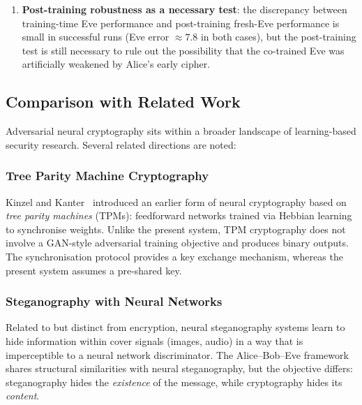 \documentclass[12pt, a4paper]{article}
\begin{document}
\begin{enumerate}[leftmargin=2em, itemsep=6pt]
  \item \textbf{Post-training robustness as a necessary test}: the
        discrepancy between training-time Eve performance and
        post-training fresh-Eve performance is small in successful runs
        (Eve error $\approx 7.8$ in both cases), but the post-training
        test is still necessary to rule out the possibility that the
        co-trained Eve was artificially weakened by Alice's early cipher.

\end{enumerate}

\subsection{Comparison with Related Work}
\label{subsec:related_work}

Adversarial neural cryptography sits within a broader landscape of
learning-based security research. Several related directions are noted:

\subsubsection*{Tree Parity Machine Cryptography}

Kinzel and Kanter~\cite{kinzel2002neural} introduced an earlier form
of neural cryptography based on \emph{tree parity machines} (TPMs):
feedforward networks trained via Hebbian learning to synchronise weights.
Unlike the present system, TPM cryptography does not involve a GAN-style
adversarial training objective and produces binary outputs. The
synchronisation protocol provides a key exchange mechanism, whereas
the present system assumes a pre-shared key.

\subsubsection*{Steganography with Neural Networks}

Related to but distinct from encryption, neural steganography systems
learn to hide information within cover signals (images, audio) in a
way that is imperceptible to a neural network discriminator. The
Alice--Bob--Eve framework shares structural similarities with
neural steganography, but the objective differs: steganography hides
the \emph{existence} of the message, while cryptography hides its
\emph{content}.
\end{document}
